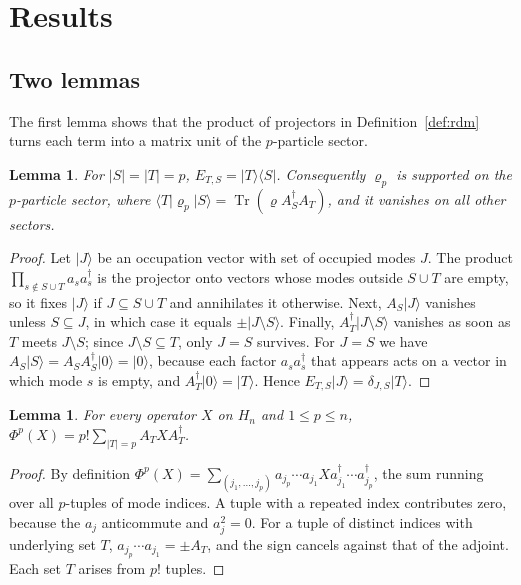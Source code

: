 \documentclass[11pt,a4paper]{article}
\newtheorem{lemma}[theorem]{Lemma}
\theoremstyle{definition}
\theoremstyle{plain}
\DeclareMathOperator{\Tr}{Tr}
\newcommand{\ket}[1]{\lvert#1\rangle}
\newcommand{\bra}[1]{\langle#1\rvert}
\begin{document}
\section{Results}\label{sec:results}
\subsection{Two lemmas}
The first lemma shows that the product of projectors in
Definition~\ref{def:rdm} turns each term into a matrix unit of the
$p$-particle sector.

\begin{lemma}\label{lem:units}
For $|S|=|T|=p$, $E_{T,S}=\ket T\bra S$. Consequently $\varrho_p$ is
supported on the $p$-particle sector, where
$\bra T\varrho_p\ket S=\Tr(\varrho A_S^\dagger A_T)$, and it vanishes on all
other sectors.
\end{lemma}

\begin{proof}
Let $\ket J$ be an occupation vector with set of occupied modes $J$. The
product $\prod_{s\notin S\cup T}a_sa_s^\dagger$ is the projector onto vectors
whose modes outside $S\cup T$ are empty, so it fixes $\ket J$ if
$J\subseteq S\cup T$ and annihilates it otherwise. Next, $A_S\ket J$ vanishes
unless $S\subseteq J$, in which case it equals $\pm\ket{J\setminus S}$.
Finally, $A_T^\dagger\ket{J\setminus S}$ vanishes as soon as $T$ meets
$J\setminus S$; since $J\setminus S\subseteq T$, only $J=S$ survives. For
$J=S$ we have $A_S\ket S=A_SA_S^\dagger\ket0=\ket0$, because each factor
$a_sa_s^\dagger$ that appears acts on a vector in which mode $s$ is empty, and
$A_T^\dagger\ket0=\ket T$. Hence $E_{T,S}\ket J=\delta_{J,S}\ket T$.
\end{proof}

\begin{lemma}\label{lem:phip}
For every operator $X$ on $H_n$ and $1\le p\le n$,
$\Phi^p(X)=p!\sum_{|T|=p}A_TXA_T^\dagger$.
\end{lemma}

\begin{proof}
By definition
$\Phi^p(X)=\sum_{(j_1,\dots,j_p)}a_{j_p}\cdots a_{j_1}X
a_{j_1}^\dagger\cdots a_{j_p}^\dagger$, the sum running over all $p$-tuples
of mode indices. A tuple with a repeated index contributes zero, because the
$a_j$ anticommute and $a_j^2=0$. For a tuple of distinct indices with
underlying set $T$, $a_{j_p}\cdots a_{j_1}=\pm A_T$, and the sign cancels
against that of the adjoint. Each set $T$ arises from $p!$ tuples.
\end{proof}
\end{document}
